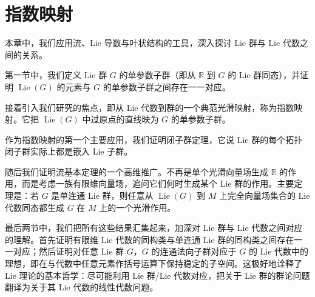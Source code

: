 \documentclass[../main.tex]{subfiles}
\begin{document}
\chapter{指数映射}\label{chapter:ch20-exponential-map}

本章中，我们应用流、Lie 导数与叶状结构的工具，深入探讨 Lie 群与 Lie 代数之间的关系。

第一节中，我们定义 Lie 群 $G$ 的单参数子群（即从 $\mathbb{R}$ 到 $G$ 的 Lie 群同态），并证明 $\operatorname{Lie}(G)$ 的元素与 $G$ 的单参数子群之间存在一一对应。

接着引入我们研究的焦点，即从 Lie 代数到群的一个典范光滑映射，称为指数映射。它把 $\operatorname{Lie}(G)$ 中过原点的直线映为 $G$ 的单参数子群。

作为指数映射的第一个主要应用，我们证明闭子群定理，它说 Lie 群的每个拓扑闭子群实际上都是嵌入 Lie 子群。

随后我们证明流基本定理的一个高维推广。不再是单个光滑向量场生成 $\mathbb{R}$ 的作用，而是考虑一族有限维向量场，追问它们何时生成某个 Lie 群的作用。主要定理是：若 $G$ 是单连通 Lie 群，则任意从 $\operatorname{Lie}(G)$ 到 $M$ 上完全向量场集合的 Lie 代数同态都生成 $G$ 在 $M$ 上的一个光滑作用。

最后两节中，我们把所有这些结果汇集起来，加深对 Lie 群与 Lie 代数之间对应的理解。首先证明有限维 Lie 代数的同构类与单连通 Lie 群的同构类之间存在一一对应；然后证明对任意 Lie 群 $G$，$G$ 的连通法向子群对应于 $G$ 的 Lie 代数中的理想，即在与代数中任意元素作括号运算下保持稳定的子空间。这极好地诠释了 Lie 理论的基本哲学：尽可能利用 Lie 群/Lie 代数对应，把关于 Lie 群的群论问题翻译为关于其 Lie 代数的线性代数问题。







\end{document}
